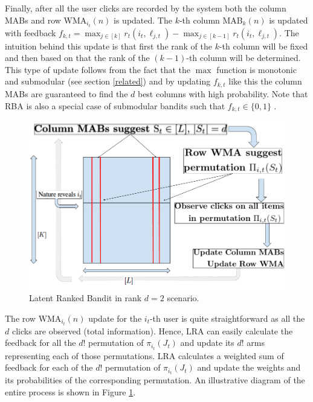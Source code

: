 Finally, after all the user clicks are recorded by the system both the column MABs and row WMA$_{i_t}(n)$ is updated. The $k$-th column MAB$_k(n)$ is updated with feedback $f_{k,t} = \max_{j\in [k]} r_t(i_t, \ell_{j,t}) - \max_{j\in [k-1]} r_t(i_t,\ell_{j,t})$. The intuition behind this update is that first the rank of the $k$-th column will be fixed and then based on that the rank of the $(k-1)$-th column will be determined.  This type of update follows from the fact that the $\max$ function is monotonic and submodular (see  section \ref{related}) and by updating $f_{k,t}$ like this the column MABs are guaranteed to find the $d$ best columns with high probability. Note that RBA is also a special case of submodular bandits such that $f_{k,t}\in\lbrace 0, 1\rbrace$ \citep{streeter2009online}. 

\begin{figure}
    \includegraphics[scale=0.2]{img/RankedBand.png}
    \caption{Latent Ranked Bandit in rank $d=2$ scenario.}
    \label{fig:rankedbandit}
    \vspace*{-1em}
\end{figure}

The row WMA$_{i_t}(n)$ update for the $i_t$-th user is quite straightforward as all the $d$ clicks are observed (total information). Hence, LRA can easily calculate the feedback for all the $d!$ permutation of $\pi_{i_t}(J_t)$ and update its $d!$ arms representing each of those permutations. LRA calculates a weighted sum of feedback for each of the $d!$ permutation of $\pi_{i_t}(J_t)$ and update the weights and its probabilities of the corresponding permutation. An illustrative diagram of the entire process is shown in Figure \ref{fig:rankedbandit}.

